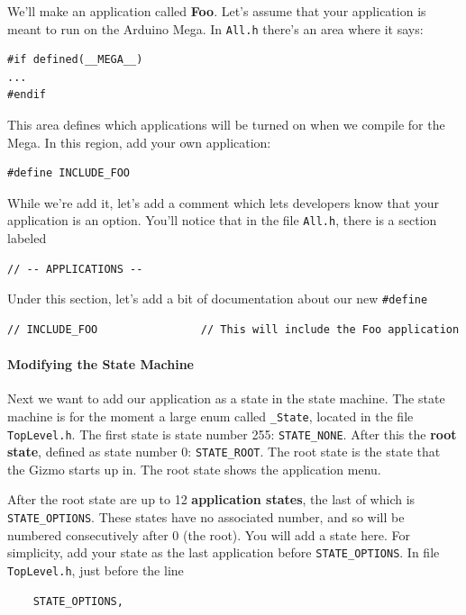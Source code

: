\documentclass{article}
\begin{document}
We'll make an application called {\bf Foo}.  Let's assume that your application is meant to run on the Arduino Mega.  In \texttt{All.h} there's an area where it says:

\begin{verbatim}
#if defined(__MEGA__)
...
#endif
\end{verbatim}

This area defines which applications will be turned on when we compile for the Mega.  In this region, add 
your own application:

\begin{verbatim}
#define INCLUDE_FOO
\end{verbatim}

While we're add it, let's add a comment which lets developers know that your application is an option.  You'll notice that in the file \texttt{All.h}, there is a section labeled

\begin{verbatim}
// -- APPLICATIONS --
\end{verbatim}

Under this section, let's add a bit of documentation about our new \texttt{\#define}

\begin{verbatim}
// INCLUDE_FOO                // This will include the Foo application
\end{verbatim}

\paragraph{Modifying the State Machine}
Next we want to add our application as a state in the state machine.  The state machine is for the moment a large enum called \texttt{\_State}, located in the file \texttt{TopLevel.h}.  The first state is state number 255: \texttt{STATE\_NONE}.  After this the {\bf root state}, defined as state number 0: \texttt{STATE\_ROOT}.  The root state is the state that the Gizmo starts up in.  The root state shows the application menu.

After the root state are up to 12 {\bf application states}, the last of which is \texttt{STATE\_OPTIONS}.  These states have no associated number, and so will be numbered consecutively after 0 (the root).  You will add a state here.  For simplicity, add your state as the last application before \texttt{STATE\_OPTIONS}.  In file \texttt{TopLevel.h}, just before the line

\begin{verbatim}
    STATE_OPTIONS,
\end{verbatim}
\end{document}
